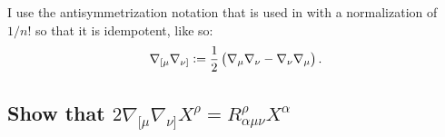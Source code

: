 I use the antisymmetrization notation that is used in
\parencite{penrose-road_to_reality} with a normalization of $1/n!$ so that it
is idempotent, like so:
\[
    \nabla_{[\mu} \nabla_{\nu]} := \frac 12 \del{
        \nabla_{\mu} \nabla_{\nu} - \nabla_{\nu} \nabla_{\mu}
    }.
\]

\subsection{Show that $2 \nabla_{[\mu} \nabla_{\nu]} X^\rho =
R^\rho_{\alpha\mu\nu} X^\alpha$}

\IfFileExists{\bibliographyfile}{
    \printbibliography
}{}



